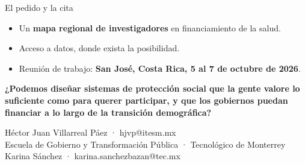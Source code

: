 \documentclass[aspectratio=169,11pt]{beamer}
\newcommand{\clave}[1]{\textcolor{acento}{\textbf{#1}}}
\newcommand{\frase}[1]{\begin{center}\Large\textbf{#1}\end{center}}
\begin{document}
\begin{frame}{El pedido y la cita}
  \begin{itemize}
    \item Un \clave{mapa regional de investigadores} en financiamiento de la salud.
    \item Acceso a datos, donde exista la posibilidad.
    \item Reunión de trabajo: \clave{San José, Costa Rica, 5 al 7 de octubre de 2026}.
  \end{itemize}
\end{frame}

\begin{frame}[plain]
  \vfill
  \frase{¿Podemos diseñar sistemas de protección social que la gente valore lo suficiente como para querer participar, y que los gobiernos puedan financiar a lo largo de la transición demográfica?}
  \vfill
  \begin{center}\small
    Héctor Juan Villarreal Páez · hjvp@itesm.mx\\
    Escuela de Gobierno y Transformación Pública · Tecnológico de Monterrey\\
    Karina Sánchez · karina.sanchezbazan@tec.mx
  \end{center}
  \vfill
\end{frame}
\end{document}

